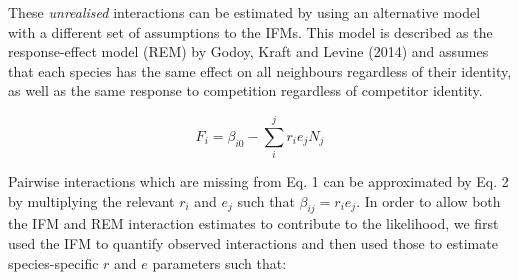 \documentclass[a4,12pt]{article}
\begin{document}
        
        

        
        These \textit{unrealised} interactions can be estimated by using an alternative model with a different set of assumptions to the IFMs. This model is described as the response-effect model (REM) by Godoy, Kraft and Levine (2014) and assumes that each species has the same effect on all neighbours regardless of their identity, as well as the same response to competition regardless of competitor identity. 
        
        \begin{equation}
        F_{i} = \beta_{i0} - \sum_{i}^{j} r_{i} e_{j} N_{j}
        \label{rem1}
        \end{equation}
        
        Pairwise interactions which are missing from Eq. 1 can be approximated by Eq. 2 by multiplying the relevant $r_{i}$ and $e_{j}$ such that $\beta_{ij} = r_{i} e_{j}$. In order to allow both the IFM and REM interaction estimates to contribute to the likelihood, we first used the IFM to quantify observed interactions and then used those to estimate species-specific $r$ and $e$ parameters such that: 
    
\end{document}
